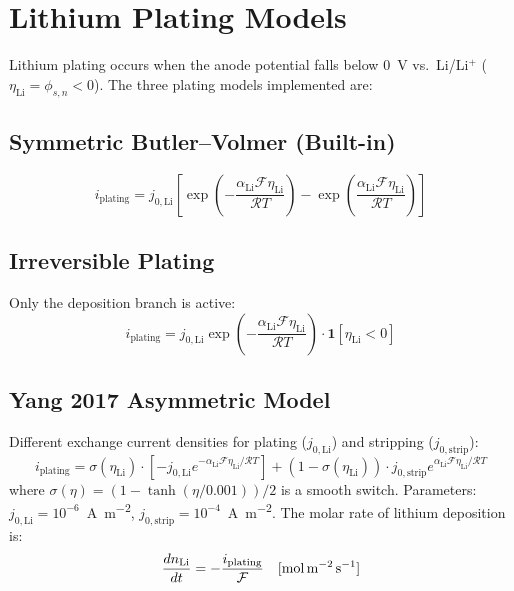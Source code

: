 \section{Lithium Plating Models}
\label{sec:li_plating}

Lithium plating occurs when the anode potential falls below 0~V vs.\ Li/Li$^+$ ($\eta_\text{Li} = \phi_{s,n} < 0$). The three plating models implemented are:

\subsection{Symmetric Butler--Volmer (Built-in)}
\begin{equation}
  i_\text{plating} = j_{0,\text{Li}}\left[\exp\!\left(-\frac{\alpha_\text{Li}\mathcal{F}\eta_\text{Li}}{\mathcal{R}T}\right) - \exp\!\left(\frac{\alpha_\text{Li}\mathcal{F}\eta_\text{Li}}{\mathcal{R}T}\right)\right]
  \label{eq:plating_bv}
\end{equation}

\subsection{Irreversible Plating}

Only the deposition branch is active:
\begin{equation}
  i_\text{plating} = j_{0,\text{Li}} \exp\!\left(-\frac{\alpha_\text{Li}\mathcal{F}\eta_\text{Li}}{\mathcal{R}T}\right) \cdot \mathbf{1}[\eta_\text{Li} < 0]
  \label{eq:plating_irrev}
\end{equation}

\subsection{Yang 2017 Asymmetric Model~\cite{Yang2017}}

Different exchange current densities for plating ($j_{0,\text{Li}}$) and stripping ($j_{0,\text{strip}}$):
\begin{equation}
  i_\text{plating} = \sigma(\eta_\text{Li}) \cdot \left[-j_{0,\text{Li}} e^{-\alpha_\text{Li}\mathcal{F}\eta_\text{Li}/\mathcal{R}T}\right] + (1-\sigma(\eta_\text{Li})) \cdot j_{0,\text{strip}} e^{\alpha_\text{Li}\mathcal{F}\eta_\text{Li}/\mathcal{R}T}
  \label{eq:plating_yang}
\end{equation}
where $\sigma(\eta) = (1 - \tanh(\eta/0.001))/2$ is a smooth switch. Parameters: $j_{0,\text{Li}} = 10^{-6}$~\si{\ampere\per\meter\squared}, $j_{0,\text{strip}} = 10^{-4}$~\si{\ampere\per\meter\squared}. The molar rate of lithium deposition is:
\begin{equation}
  \ddt{n_\text{Li}} = -\frac{i_\text{plating}}{\mathcal{F}} \quad [\si{\mol\per\meter\squared\per\second}]
  \label{eq:dn_Li_dt}
\end{equation}

